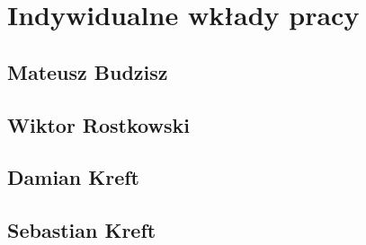 

\chapter{Indywidualne wkłady pracy}
\label{sec:indywidualne-wklady-pracy}


\section{Mateusz Budzisz}
\label{sec:mateusz-budzisz}

\section{Wiktor Rostkowski}
\label{sec:wiktor-rostkowski}

\section{Damian Kreft}
\label{sec:damian-kreft}

\section{Sebastian Kreft}
\label{sec:sebastian-kreft}




